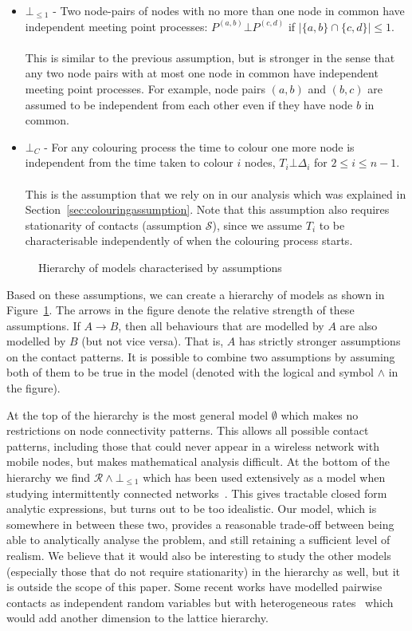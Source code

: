 \documentclass{article}
\begin{document}
\begin{itemize}
\item $\bot_{\le 1}$ - Two node-pairs of nodes with no more than one
  node in common have independent meeting point processes: $P^{(a,b)}
  \bot P^{(c,d)}$ if $|\{a,b\} \cap \{c,d\}| \le
  1$. \\
  \\
  This is similar to the previous assumption, but is stronger in the
  sense that any two node pairs with at most one node in common have
  independent meeting point processes. For example, node pairs $(a,b)$
  and $(b,c)$ are assumed to be independent from each other even if
  they have node $b$ in common.
\item $\bot_C$ - For any colouring process the time to colour one more
  node is independent from the time taken to colour $i$ nodes, $T_i
  \bot \Delta_i$ for $2 \le i \le n-1$.\\
  \\
  This is the assumption that we rely on in our analysis which was
  explained in Section~\ref{sec:colouringassumption}. Note that this
  assumption also requires stationarity of contacts (assumption
  $\mathcal{S}$), since we assume $T_i$ to be characterisable
  independently of when the colouring process starts.
\end{itemize}
\begin{figure}[tb]
  \centering
   \caption{Hierarchy of models characterised by assumptions}
  \label{fig:hierarchy}
\end{figure}


Based on these assumptions, we can create a hierarchy of models as
shown in Figure~\ref{fig:hierarchy}. The arrows in the figure denote
the relative strength of these assumptions. If $A \rightarrow B$, then
all behaviours that are modelled by $A$ are also modelled by $B$ (but
not vice versa). That is, $A$ has strictly stronger assumptions on the
contact patterns. It is possible to combine two assumptions by
assuming both of them to be true in the model (denoted with the
logical and symbol $\land$ in the figure).

At the top of the hierarchy is the most general model $\emptyset$
which makes no restrictions on node connectivity patterns. This allows
all possible contact patterns, including those that could never appear
in a wireless network with mobile nodes, but makes mathematical
analysis difficult. At the bottom of the hierarchy we find
$\mathcal{R}\land\bot_{\le1}$ which has been used extensively as a
model when studying intermittently connected
networks~\cite{altman10,resta11}. This gives tractable closed form
analytic expressions, but turns out to be too idealistic. Our model,
which is somewhere in between these two, provides a reasonable
trade-off between being able to analytically analyse the problem, and
still retaining a sufficient level of realism. We believe that it would
also be interesting to study the other models (especially those that
do not require stationarity) in the hierarchy as well, but it is
outside the scope of this paper. Some recent works have modelled
pairwise contacts as independent random variables but with
heterogeneous rates~\cite{picu12} which would add another dimension to
the lattice hierarchy.
\end{document}
